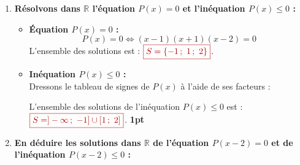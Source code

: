 \documentclass[12pt,a4paper]{article}
\newcommand{\redbox}[1]{\color{myred}\boxed{#1}\color{black}}
\begin{document}
\begin{enumerate}
\begin{enumerate}
        Cherchons les racines du trinôme $Q(x) = x^2 - x - 2$. \\
        On remarque une racine évidente $x_1 = -1$ (car $(-1)^2 - (-1) - 2 = 1 + 1 - 2 = 0$). \\
        Le produit des racines étant $\frac{c}{a} = -2$, la seconde racine est $x_2 = 2$.
        
        D'où la factorisation de $Q(x) = (x + 1)(x - 2)$.
        
        La factorisation complète de $P(x)$ est donc :
        \[\redbox{P(x) = (x - 1)(x + 1)(x - 2)}\] \hfill \textbf{0,25pt}
        
        \item \textbf{Résolvons dans $\mathbb{R}$ l'équation $P(x) = 0$ et l'inéquation $P(x) \leq 0$ :}
        
        \begin{itemize}
            \item \textbf{Équation $P(x) = 0$ :}
            \[ P(x) = 0 \iff (x - 1)(x + 1)(x - 2) = 0 \]
            L'ensemble des solutions est : $\redbox{S = \{-1 \,;~ 1 \,;~ 2\}}$.
            
            \item \textbf{Inéquation $P(x) \leq 0$ :} \\
            Dressons le tableau de signes de $P(x)$ à l'aide de ses facteurs :
            
            \begin{center}
            \end{center}
            
            L'ensemble des solutions de l'inéquation $P(x) \le 0$ est : $\redbox{S = ]-\infty \,;~ -1] \cup [1 \,;~ 2]}$. \hfill \textbf{1pt}
        \end{itemize}
        
        \item \textbf{En déduire les solutions dans $\mathbb{R}$ de l'équation $P(x-2) = 0$ et de l'inéquation $P(x-2) \leq 0$ :}
        

\end{enumerate}
\end{enumerate}
\end{document}
